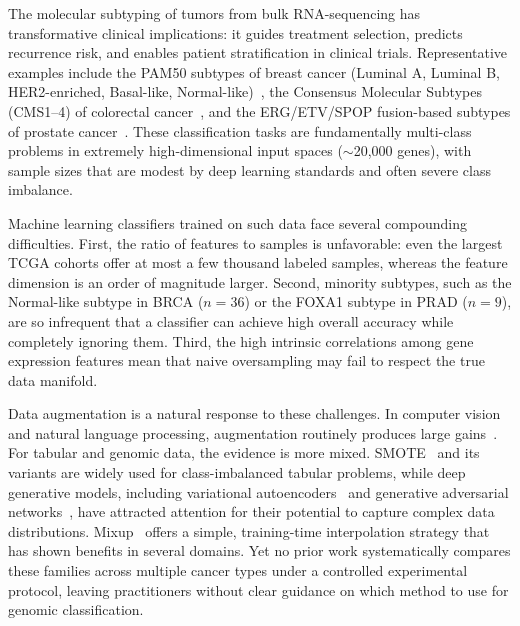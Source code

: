 \documentclass{article}
\begin{document}
The molecular subtyping of tumors from bulk RNA-sequencing has transformative clinical implications:
it guides treatment selection, predicts recurrence risk, and enables patient stratification in
clinical trials. Representative examples include the PAM50 subtypes of breast cancer (Luminal A,
Luminal B, HER2-enriched, Basal-like, Normal-like)~\cite{Parker2009}, the Consensus Molecular
Subtypes (CMS1--4) of colorectal cancer~\cite{Guinney2015}, and the ERG/ETV/SPOP fusion-based
subtypes of prostate cancer~\cite{Cancer2015}. These classification tasks are fundamentally
multi-class problems in extremely high-dimensional input spaces ($\sim$20{,}000 genes), with sample
sizes that are modest by deep learning standards and often severe class imbalance.

Machine learning classifiers trained on such data face several compounding difficulties. First, the
ratio of features to samples is unfavorable: even the largest TCGA cohorts offer at most a few
thousand labeled samples, whereas the feature dimension is an order of magnitude larger. Second,
minority subtypes, such as the Normal-like subtype in BRCA ($n{=}36$) or the FOXA1 subtype in PRAD
($n{=}9$), are so infrequent that a classifier can achieve high overall accuracy while completely
ignoring them. Third, the high intrinsic correlations among gene expression features mean that
naive oversampling may fail to respect the true data manifold.

Data augmentation is a natural response to these challenges. In computer vision and natural
language processing, augmentation routinely produces large gains~\cite{Shorten2019,Wei2019}.
For tabular and genomic data, the evidence is more mixed. SMOTE~\cite{Chawla2002} and its variants
are widely used for class-imbalanced tabular problems, while deep generative models, including variational
autoencoders~\cite{Kingma2014} and generative adversarial networks~\cite{Goodfellow2014}, have
attracted attention for their potential to capture complex data distributions. Mixup~\cite{Zhang2018}
offers a simple, training-time interpolation strategy that has shown benefits in several domains.
Yet no prior work systematically compares these families across multiple cancer types under a
controlled experimental protocol, leaving practitioners without clear guidance on which method to
use for genomic classification.
\end{document}
